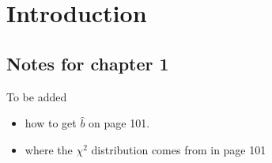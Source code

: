 \chapter{Introduction}

\section{Notes for chapter 1}
To be added
\begin{itemize}
    \item how to get $\hat b$ on page 101.
    \item where the $\chi^2$ distribution comes from in page 101
\end{itemize}
